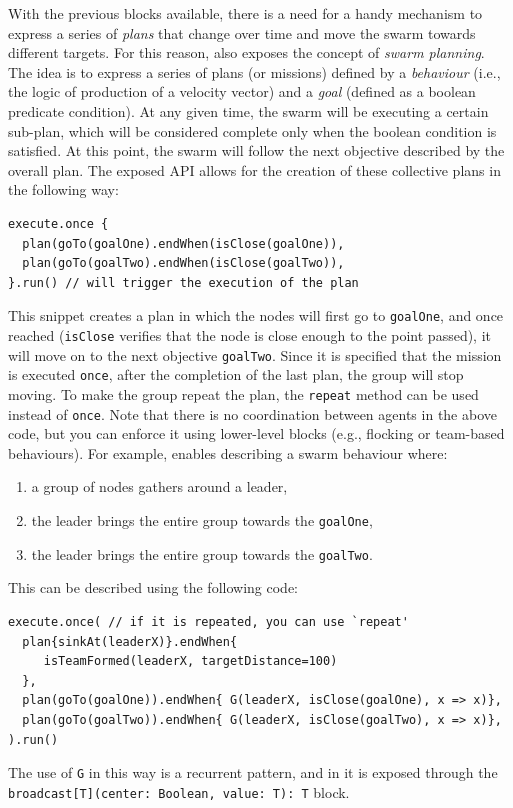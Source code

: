 With the previous blocks available, there is a need for a handy mechanism to express a series of \emph{plans} that 
 change over time and move the swarm towards different targets. 
%
For this reason, \MacroSwarm{} also exposes the concept of \emph{swarm planning}. 
The idea is to express a series of plans (or missions)
 defined by a \emph{behaviour} 
 (i.e., the logic of production of a velocity vector) 
 and a \emph{goal} (defined as a boolean predicate condition). 
%
At any given time, the swarm will be executing a certain sub-plan, 
 which will be considered complete only when the boolean condition is satisfied. 
%
At this point, the swarm will follow the next objective described by the overall plan.
%
The exposed API allows for the creation of these collective plans in the following way:
\begin{lstlisting}
execute.once {
  plan(goTo(goalOne).endWhen(isClose(goalOne)),
  plan(goTo(goalTwo).endWhen(isClose(goalTwo)),
}.run() // will trigger the execution of the plan
\end{lstlisting}
This snippet creates a plan 
 in which the nodes will first go to \lstinline|goalOne|, 
 and once reached (\lstinline|isClose| verifies that the node is close enough to the point passed), 
 it will move on to the next objective \lstinline|goalTwo|.
Since it is specified that the mission is executed \lstinline|once|, 
 after the completion of the last plan, the group will stop moving.
To make the group repeat the plan, 
 the \lstinline|repeat| method can be used instead of \lstinline|once|.
%
Note that there is no coordination between agents in the above code, 
 but you can enforce it using lower-level blocks (e.g., flocking or team-based behaviours).
%
For example, \MacroSwarm{} enables describing a swarm behaviour where:
\begin{enumerate}
  \item a group of nodes gathers around a leader,
  \item the leader brings the entire group towards the \lstinline|goalOne|,
  \item the leader brings the entire group towards the \lstinline|goalTwo|.

\end{enumerate}
%
This can be described using the following code:
\begin{lstlisting}[xrightmargin=-5pt]
execute.once( // if it is repeated, you can use `repeat'
  plan{sinkAt(leaderX)}.endWhen{
     isTeamFormed(leaderX, targetDistance=100)
  },
  plan(goTo(goalOne)).endWhen{ G(leaderX, isClose(goalOne), x => x)},
  plan(goTo(goalTwo)).endWhen{ G(leaderX, isClose(goalTwo), x => x)},
).run()
\end{lstlisting}
The use of \lstinline|G| in this way is a recurrent pattern, 
 and in \scafi{} it is exposed through the \lstinline|broadcast[T](center: Boolean, value: T): T| block.
 
